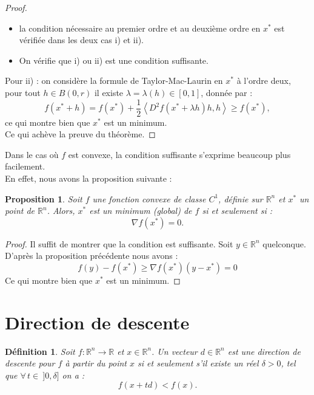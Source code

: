 \documentclass[12pt,a4paper,openay]{book}
\newtheorem{Def}{D\'efinition}[chapter]
\numberwithin{equation}{chapter}
\newtheorem{prop}{Proposition}[chapter]
\newcommand{\R}{\mathbb{R}}
\let\oldforall\forall
\renewcommand{\forall}{\oldforall\,}
\begin{document}
	\begin{proof}
	\hfill
	\begin{itemize}
		\item[$\bullet$] la condition n\'ecessaire au premier ordre et au deuxi\`eme ordre en $x^*$ est v\'erifi\'ee dans les deux cas i) et ii).
		\item[$\bullet$] On v\'erifie que i) ou ii) est une condition suffisante.
	\end{itemize}	
		Pour ii) : on consid\`ere la formule de Taylor-Mac-Laurin en $x^*$ \`a l'ordre deux, pour tout $h \in B(0, r)$ il existe $\lambda=\lambda(h) \in[0,1]$, donn\'ee par :
		$$
		f\left(x^*+h\right)=f(x^*)+\frac{1}{2}\left\langle D^2 f\left(x^*+\lambda h\right) h, h\right\rangle \geq f(x^*),
		$$
		ce qui montre bien que $x^*$ est un minimum.\\
		Ce qui ach\`eve la preuve du th\'eor\`eme.
	\end{proof}
	
	Dans le cas o\`u $f$ est convexe, la condition suffisante s'exprime beaucoup plus facilement.\\
	En effet, nous avons la proposition suivante :
	\begin{prop}
	Soit $f$ une fonction convexe de classe $C^1$, d\'efinie sur $\R^n$ et $x^*$ un point de $\R^n$. Alors, $x^*$ est un minimum (global) de $f$ si et seulement si :
		$$
		\nabla f(x^*)=0 .
		$$
	\end{prop}
	
	\begin{proof}
	Il suffit de montrer que la condition est suffisante.
		Soit $y\in \R^n$ quelconque. D'apr\`es la proposition pr\'ec\'edente nous avons :
		$$
		f(y)-f(x^*) \geq \nabla f(x^*)\left(y-x^*\right)=0 
		$$	
		Ce qui montre bien que $x^*$ est un minimum.
	\end{proof}
	
	\section{Direction de descente}
	
	\begin{Def}
		Soit $f :\R^n \to \R$ et $x\in \R^n$. Un vecteur $d\in\R^n$ est une direction de descente pour $f$ \`a partir du point $x$ si et seulement s'il existe un r\'eel $\delta >0$, tel que $\forall t \in\ ]0,\delta] $ on a :
		$$ f(x+t d)< f(x) .$$
	\end{Def} 
	
\end{document}
